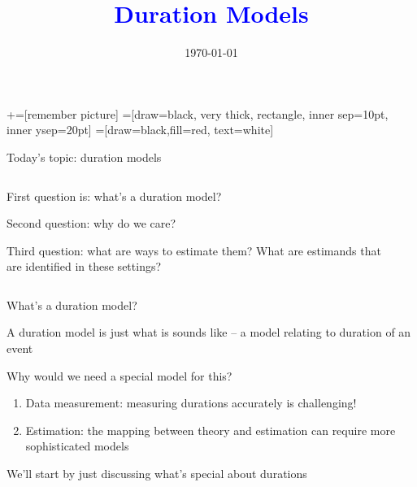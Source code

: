 \documentclass[notes,11pt, aspectratio=169]{beamer}
\title[]{\textcolor{blue}{Duration Models}}
\author[PGP]{}
\institute[FRBNY]{\small{Paul Goldsmith-Pinkham}}
\date{\today}
\newenvironment{wideitemize}{\itemize\addtolength{\itemsep}{10pt}}{\enditemize}
\begin{document}
\newcommand\marktopleft[1]{%
    \tikz[overlay,remember picture] 
        \node (marker-#1-a) at (-.3em,.3em) {};%
}
\newcommand\markbottomright[2]{%
    \tikz[overlay,remember picture] 
        \node (marker-#1-b) at (0em,0em) {};%
}
+=[remember picture] 
 =[draw=black, very thick, rectangle, inner sep=10pt, inner ysep=20pt]
 =[draw=black,fill=red, text=white]

\begin{frame}
\maketitle

\end{frame}


\begin{frame}{Today's topic: duration models}
  \begin{columns}[T] %
    \begin{column}{.7\textwidth}
      \begin{wideitemize}
      \item First question is: what's a duration model?
      \item Second question: why do we care?
      \item Third question: what are ways to estimate them? What are
        estimands that are identified in these settings?
      \end{wideitemize}
    \end{column}%
  \hfill%
  \begin{column}{.4\textwidth}
  \end{column}
\end{columns}
\end{frame}

\begin{frame}{What's a duration model?}
  \begin{wideitemize}
  \item A duration model is just what is sounds like -- a model
    relating to duration of an event
  \item Why would we need a special model for this?
    \begin{enumerate}
    \item Data measurement: measuring durations accurately is challenging!
    \item Estimation: the mapping between theory and estimation can
      require more sophisticated models
    \end{enumerate}
  \item We'll start by just discussing what's special about durations
  \end{wideitemize}
\end{frame}
\end{document}
